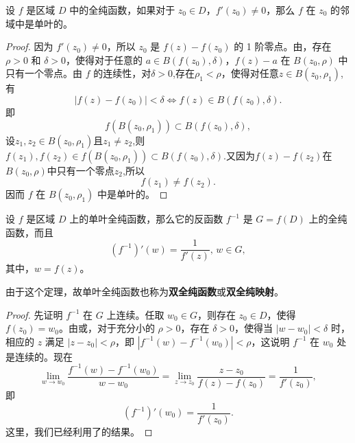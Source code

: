 \documentclass[../../main.tex]{subfiles}%
\begin{document}
\begin{theorem}\label{theorem:定理4.4.8}
设 \( f \) 是区域 \( D \) 中的全纯函数，如果对于 \( z_0 \in D \)，\( f'(z_0) \neq 0 \)，那么 \( f \) 在 \( z_0 \) 的邻域中是单叶的。
\end{theorem}
\begin{proof}
因为 \( f'(z_0) \neq 0 \)，所以 \( z_0 \) 是 \( f(z) - f(z_0) \) 的 1 阶零点。由，存在 \( \rho > 0 \) 和 \( \delta > 0 \)，使得对于任意的 \( a \in B(f(z_0), \delta) \)，\( f(z) - a \) 在 \( B(z_0, \rho) \) 中只有一个零点。由 \( f \) 的连续性，对$\delta>0$,存在\( \rho_1 < \rho \)，使得对任意$z\in B(z_0,\rho_1)$,有
\[
|f(z)-f(z_0)|<\delta \iff f(z)\in B(f(z_0),\delta).
\]
即
\[
f(B(z_0, \rho_1)) \subset B(f(z_0), \delta),
\]
设$z_1,z_2\in B(z_0,\rho_1)$且$z_1\ne z_2$,则$f(z_1),f(z_2)\in f(B(z_0, \rho_1)) \subset B(f(z_0), \delta)$.又因为$f(z)-f(z_2)$在$B(z_0,\rho)$中只有一个零点$z_2$,所以
\[
f(z_1)\ne f(z_2).
\]
因而 \( f \) 在 \( B(z_0, \rho_1) \) 中是单叶的。 
\end{proof}

\begin{theorem}\label{theorem:定理4.4.9}
设 \( f \) 是区域 \( D \) 上的单叶全纯函数，那么它的反函数 \( f^{-1} \) 是 \( G = f(D) \) 上的全纯函数，而且
\[
(f^{-1})'(w) = \frac{1}{f'(z)}, \, w \in G,
\]
其中，\( w = f(z) \)。
\end{theorem}
\begin{note}
由于这个定理，故单叶全纯函数也称为\textbf{双全纯函数}或\textbf{双全纯映射}。
\end{note}
\begin{proof}
先证明 \( f^{-1} \) 在 \( G \) 上连续。任取 \( w_0 \in G \)，则存在 \( z_0 \in D \)，使得 \( f(z_0) = w_0 \)。由或，对于充分小的 \( \rho > 0 \)，存在 \( \delta > 0 \)，使得当 \( |w - w_0| < \delta \) 时，相应的 \( z \) 满足 \( |z - z_0| < \rho \)，即 \( |f^{-1}(w) - f^{-1}(w_0)| < \rho \)，这说明 \( f^{-1} \) 在 \( w_0 \) 处是连续的。现在
\[
\lim_{w \to w_0} \frac{f^{-1}(w) - f^{-1}(w_0)}{w - w_0} = \lim_{z \to z_0} \frac{z - z_0}{f(z) - f(z_0)} = \frac{1}{f'(z_0)},
\]
即
\[
(f^{-1})'(w_0) = \frac{1}{f'(z_0)}.
\]
这里，我们已经利用了的结果。 
\end{proof}
\end{document}
